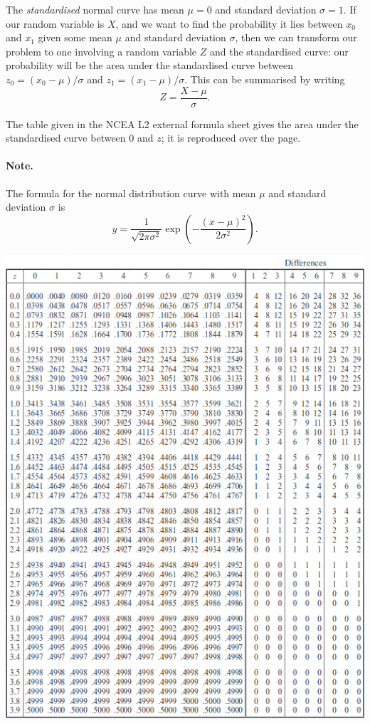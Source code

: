 The \emph{standardised} normal curve has mean $ \mu = 0 $ and standard deviation $ \sigma = 1 $.
If our random variable is $ X $, and we want to find the probability it lies between $ x_0 $ and $ x_1 $
given some mean $ \mu $ and standard deviation $ \sigma $, then we can transform our problem
to one involving a random variable $ Z $ and the standardised curve: our probability will
be the area under the standardised curve between $ z_0 = (x_0 - \mu)/\sigma $ and $ z_1 = (x_1 - \mu)/\sigma $.
This can be summarised by writing
\begin{displaymath}
  Z = \frac{X - \mu}{\sigma}.
\end{displaymath}

The table given in the NCEA L2 external formula sheet gives the area under the standardised curve between 0 and $ z $;
it is reproduced over the page.

\paragraph{Note.} The formula for the normal distribution curve with mean $ \mu $ and standard deviation $ \sigma $ is
\begin{displaymath}
  y = \frac{1}{\sqrt{2\pi \sigma^2}} \exp\left(-\frac{(x - \mu)^2}{2\sigma^2}\right).
\end{displaymath}

\clearpage
\begin{center}
  \includegraphics[height=0.8\textheight]{distributiontable}
\end{center}
\clearpage

